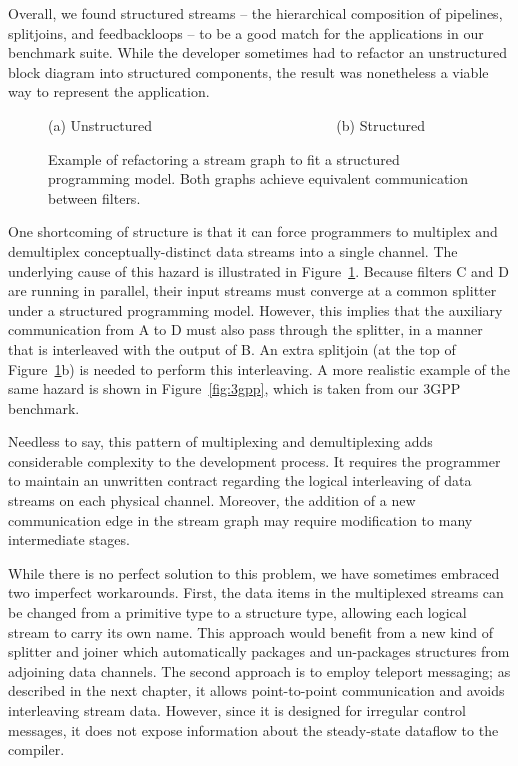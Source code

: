 \mybegin

  Overall, we found structured streams --
  the hierarchical composition of pipelines, splitjoins, and
  feedbackloops -- to be a good match for the applications in our
  benchmark suite.  While the developer sometimes had to refactor an
  unstructured block diagram into structured components, the result
  was nonetheless a viable way to represent the application.

\begin{figure}[t]
\centering
{}

(a) Unstructured ~~~~~~~~~~~~~~~~~~~~~~~~~ (b) Structured~~~~~~
\caption[Refactoring a stream graph to fit a structured programming
  model]{Example of refactoring a stream graph to fit a structured
  programming model.  Both graphs achieve equivalent communication
  between filters.
\protect\label{fig:interleaving}}
\end{figure}

  One shortcoming of structure is that it can force programmers to
  multiplex and demultiplex conceptually-distinct data streams into a
  single channel.  The underlying cause of this hazard is illustrated
  in Figure~\ref{fig:interleaving}.  Because filters C and D are
  running in parallel, their input streams must converge at a common
  splitter under a structured programming model.  However, this
  implies that the auxiliary communication from A to D must also pass
  through the splitter, in a manner that is interleaved with the
  output of B.  An extra splitjoin (at the top of
  Figure~\ref{fig:interleaving}b) is needed to perform this
  interleaving.  A more realistic example of the same hazard is shown
  in Figure~\ref{fig:3gpp}, which is taken from our 3GPP benchmark.

  Needless to say, this pattern of multiplexing and demultiplexing
  adds considerable complexity to the development process.  It
  requires the programmer to maintain an unwritten contract regarding
  the logical interleaving of data streams on each physical channel.
  Moreover, the addition of a new communication edge in the stream
  graph may require modification to many intermediate stages.

  While there is no perfect solution to this problem, we have
  sometimes embraced two imperfect workarounds.  First, the data items
  in the multiplexed streams can be changed from a primitive type to a
  structure type, allowing each logical stream to carry its own name.
  This approach would benefit from a new kind of splitter and joiner
  which automatically packages and un-packages structures from
  adjoining data channels.  The second approach is to employ teleport
  messaging; as described in the next chapter, it allows
  point-to-point communication and avoids interleaving stream data.
  However, since it is designed for irregular control messages, it
  does not expose information about the steady-state dataflow to the
  compiler.

